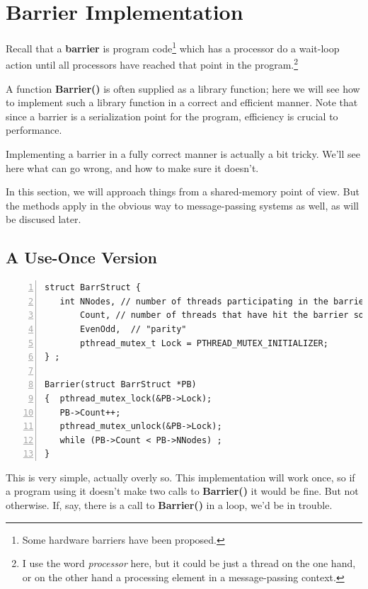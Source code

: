 \section{Barrier Implementation} 

Recall that a \textbf{barrier} is program code\footnote{Some hardware
barriers have been proposed.} which has a processor do a wait-loop
action until all processors have reached that point in the
program.\footnote{I use the word {\it processor} here, but it could be
just a thread on the one hand, or on the other hand a processing element
in a message-passing context.}
  
A function {\bf Barrier()} is often supplied as a library function; here
we will see how to implement such a library function in a correct and
efficient manner.  Note that since a barrier is a serialization point
for the program, efficiency is crucial to performance.

Implementing a barrier in a fully correct manner is actually a bit
tricky.  We'll see here what can go wrong, and how to make sure it
doesn't.

In this section, we will approach things from a shared-memory point of
view.  But the methods apply in the obvious way to message-passing
systems as well, as will be discused later. 

\subsection{A Use-Once Version}

\begin{samepage}
\begin{Verbatim}[fontsize=\relsize{-2},numbers=left]
struct BarrStruct {
   int NNodes, // number of threads participating in the barrier
       Count, // number of threads that have hit the barrier so far
       EvenOdd,  // "parity"
       pthread_mutex_t Lock = PTHREAD_MUTEX_INITIALIZER;
} ;

Barrier(struct BarrStruct *PB)
{  pthread_mutex_lock(&PB->Lock);
   PB->Count++;
   pthread_mutex_unlock(&PB->Lock);
   while (PB->Count < PB->NNodes) ;
}
\end{Verbatim}
\end{samepage}

This is very simple, actually overly so. This implementation will work
once, so if a program using it doesn't make two calls to {\bf Barrier()}
it would be fine.  But not otherwise.  If, say, there is a call to {\bf
Barrier()} in a loop, we'd be in trouble.

